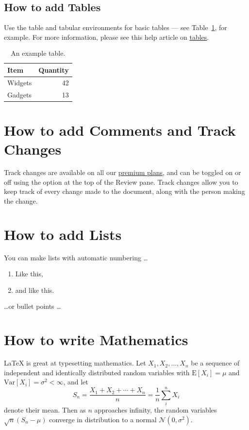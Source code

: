\documentclass[a4paper,12pt]{scrreprt}
\begin{document}
\subsection{How to add Tables}

Use the table and tabular environments for basic tables --- see Table~\ref{tab:widgets}, for example. For more information, please see this help article on \href{https://www.overleaf.com/learn/latex/tables}{tables}. 

\begin{table}
\centering
\begin{tabular}{l|r}
Item & Quantity \\\hline
Widgets & 42 \\
Gadgets & 13
\end{tabular}
\caption{\label{tab:widgets}An example table.}
\end{table}

\section{How to add Comments and Track Changes}

Track changes are available on all our \href{https://www.overleaf.com/user/subscription/plans}{premium plans}, and can be toggled on or off using the option at the top of the Review pane. Track changes allow you to keep track of every change made to the document, along with the person making the change. 

\section{How to add Lists}

You can make lists with automatic numbering \dots

\begin{enumerate}
\item Like this,
\item and like this.
\end{enumerate}
\dots or bullet points \dots

\section{How to write Mathematics}

\LaTeX{} is great at typesetting mathematics. Let $X_1, X_2, \ldots, X_n$ be a sequence of independent and identically distributed random variables with $\text{E}[X_i] = \mu$ and $\text{Var}[X_i] = \sigma^2 < \infty$, and let
\[S_n = \frac{X_1 + X_2 + \cdots + X_n}{n}
      = \frac{1}{n}\sum_{i}^{n} X_i\]
denote their mean. Then as $n$ approaches infinity, the random variables $\sqrt{n}(S_n - \mu)$ converge in distribution to a normal $\mathcal{N}(0, \sigma^2)$.
\end{document}
